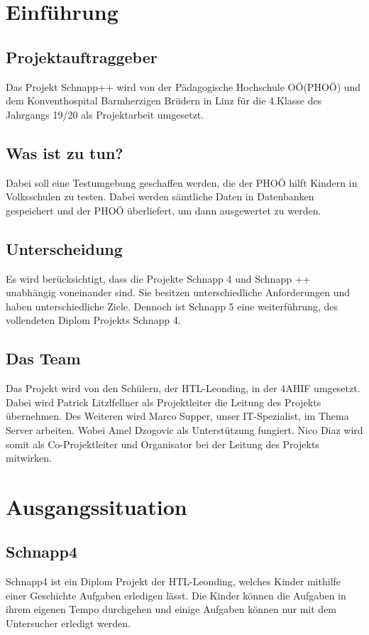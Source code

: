 \documentclass[12pt]{article}
\theoremstyle{definition}
\begin{document}
\tableofcontents
\pagebreak

\section{Einführung}

\subsection{Projektauftraggeber}
Das Projekt Schnapp++ wird von der Pädagogische Hochschule OÖ(PHOÖ) und dem Konventhospital Barmherzigen Brüdern in Linz für die 4.Klasse des Jahrgangs 19/20 als Projektarbeit umgesetzt. 
\newline
\subsection{Was ist zu tun?}
Dabei soll eine Testumgebung geschaffen werden, die der PHOÖ hilft Kindern in Volksschulen zu testen. Dabei werden sämtliche Daten in Datenbanken gespeichert und der PHOÖ überliefert, um dann ausgewertet zu werden.
\newline
\subsection{Unterscheidung}
Es wird berücksichtigt, dass die Projekte Schnapp 4 und Schnapp ++ unabhängig voneinander sind.  Sie besitzen unterschiedliche Anforderungen und haben unterschiedliche Ziele. Dennoch ist Schnapp 5 eine weiterführung, des vollendeten Diplom Projekts Schnapp 4.
\newline
\subsection{Das Team}
Das Projekt wird von den Schülern, der HTL-Leonding, in der 4AHIF umgesetzt. Dabei wird Patrick Litzlfellner als Projektleiter die Leitung des Projekts übernehmen. Des Weiteren wird Marco Supper, unser IT-Spezialist, im Thema Server arbeiten. Wobei Amel Dzogovic als Unterstützung fungiert. Nico Diaz wird somit als Co-Projektleiter und Organisator bei der Leitung des Projekts mitwirken.

\pagebreak

\section{Ausgangssituation}

\subsection{Schnapp4}
Schnapp4 ist ein Diplom Projekt der HTL-Leonding, welches Kinder mithilfe einer Geschichte Aufgaben erledigen lässt. Die Kinder können die Aufgaben in ihrem eigenen Tempo durchgehen und einige Aufgaben können nur mit dem Untersucher erledigt werden.
\end{document}
